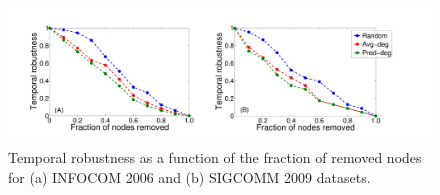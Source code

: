 \begin{figure}[!ht]
  \begin{center}
  \includegraphics[width=0.9\linewidth, angle=0]{./texfiles/Chapter_1/fig/attack_all-eps-converted-to.pdf}
  \caption{\label{fig_attack}Temporal robustness as a function of the fraction of removed nodes for (a) INFOCOM 2006 and (b) SIGCOMM 2009 datasets.}
  \end{center}
 \end{figure}

